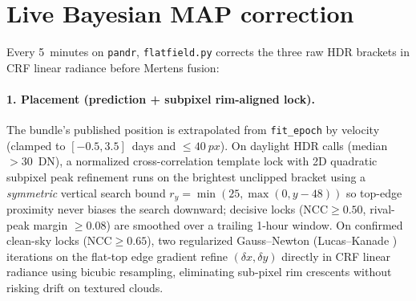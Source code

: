 \documentclass[11pt,a4paper]{article}
\newcommand{\code}[1]{\texttt{\small #1}}
\begin{document}
\section{Live Bayesian MAP correction}
\label{sec:apply}

Every 5~minutes on \code{pandr}, \code{flatfield.py} corrects the three raw HDR
brackets in CRF linear radiance before Mertens fusion:

\paragraph{1. Placement (prediction + subpixel rim-aligned lock).}
The bundle's published position is extrapolated from \code{fit\_epoch} by velocity
(clamped to $[-0.5, 3.5]$~days and $\le \SI{40}{px}$). On daylight HDR calls
(median $> 30$~DN), a normalized cross-correlation template lock
\citep{lewis1995ncc} with 2D quadratic subpixel peak refinement runs on the brightest
unclipped bracket using a \emph{symmetric} vertical search bound
$r_y = \min(25, \max(0, y - 48))$ so top-edge proximity never biases the search
downward; decisive locks ($\mathrm{NCC} \ge 0.50$, rival-peak margin $\ge 0.08$) are
smoothed over a trailing 1-hour window. On confirmed clean-sky locks
($\mathrm{NCC} \ge 0.65$), two regularized Gauss--Newton (Lucas--Kanade
\citep{lucas1981iterative}) iterations on the flat-top edge gradient refine
$(\delta x, \delta y)$ directly in CRF linear radiance using bicubic resampling,
eliminating sub-pixel rim crescents without risking drift on textured clouds.
\end{document}
